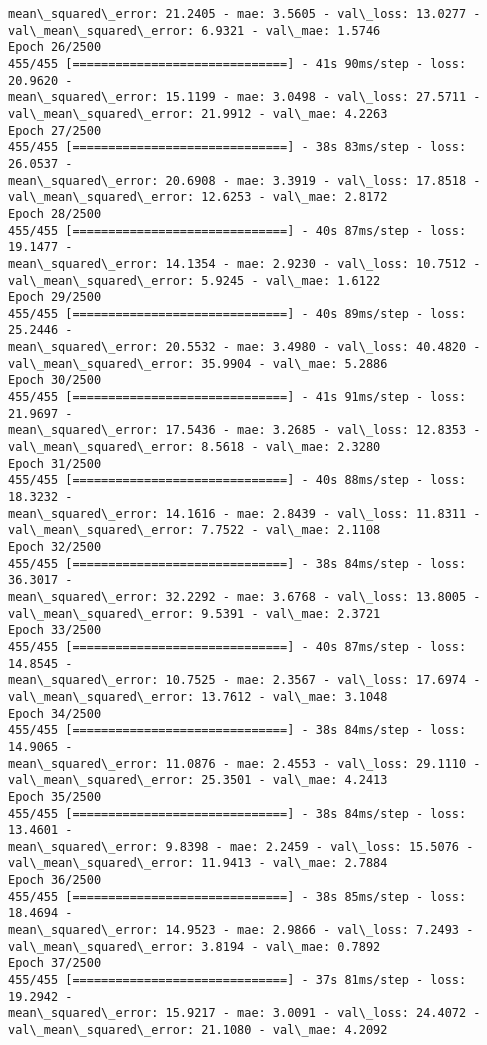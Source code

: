 \documentclass[11pt]{article}
\begin{document}
\begin{Verbatim}[commandchars=\\\{\}]
mean\_squared\_error: 21.2405 - mae: 3.5605 - val\_loss: 13.0277 -
val\_mean\_squared\_error: 6.9321 - val\_mae: 1.5746
Epoch 26/2500
455/455 [==============================] - 41s 90ms/step - loss: 20.9620 -
mean\_squared\_error: 15.1199 - mae: 3.0498 - val\_loss: 27.5711 -
val\_mean\_squared\_error: 21.9912 - val\_mae: 4.2263
Epoch 27/2500
455/455 [==============================] - 38s 83ms/step - loss: 26.0537 -
mean\_squared\_error: 20.6908 - mae: 3.3919 - val\_loss: 17.8518 -
val\_mean\_squared\_error: 12.6253 - val\_mae: 2.8172
Epoch 28/2500
455/455 [==============================] - 40s 87ms/step - loss: 19.1477 -
mean\_squared\_error: 14.1354 - mae: 2.9230 - val\_loss: 10.7512 -
val\_mean\_squared\_error: 5.9245 - val\_mae: 1.6122
Epoch 29/2500
455/455 [==============================] - 40s 89ms/step - loss: 25.2446 -
mean\_squared\_error: 20.5532 - mae: 3.4980 - val\_loss: 40.4820 -
val\_mean\_squared\_error: 35.9904 - val\_mae: 5.2886
Epoch 30/2500
455/455 [==============================] - 41s 91ms/step - loss: 21.9697 -
mean\_squared\_error: 17.5436 - mae: 3.2685 - val\_loss: 12.8353 -
val\_mean\_squared\_error: 8.5618 - val\_mae: 2.3280
Epoch 31/2500
455/455 [==============================] - 40s 88ms/step - loss: 18.3232 -
mean\_squared\_error: 14.1616 - mae: 2.8439 - val\_loss: 11.8311 -
val\_mean\_squared\_error: 7.7522 - val\_mae: 2.1108
Epoch 32/2500
455/455 [==============================] - 38s 84ms/step - loss: 36.3017 -
mean\_squared\_error: 32.2292 - mae: 3.6768 - val\_loss: 13.8005 -
val\_mean\_squared\_error: 9.5391 - val\_mae: 2.3721
Epoch 33/2500
455/455 [==============================] - 40s 87ms/step - loss: 14.8545 -
mean\_squared\_error: 10.7525 - mae: 2.3567 - val\_loss: 17.6974 -
val\_mean\_squared\_error: 13.7612 - val\_mae: 3.1048
Epoch 34/2500
455/455 [==============================] - 38s 84ms/step - loss: 14.9065 -
mean\_squared\_error: 11.0876 - mae: 2.4553 - val\_loss: 29.1110 -
val\_mean\_squared\_error: 25.3501 - val\_mae: 4.2413
Epoch 35/2500
455/455 [==============================] - 38s 84ms/step - loss: 13.4601 -
mean\_squared\_error: 9.8398 - mae: 2.2459 - val\_loss: 15.5076 -
val\_mean\_squared\_error: 11.9413 - val\_mae: 2.7884
Epoch 36/2500
455/455 [==============================] - 38s 85ms/step - loss: 18.4694 -
mean\_squared\_error: 14.9523 - mae: 2.9866 - val\_loss: 7.2493 -
val\_mean\_squared\_error: 3.8194 - val\_mae: 0.7892
Epoch 37/2500
455/455 [==============================] - 37s 81ms/step - loss: 19.2942 -
mean\_squared\_error: 15.9217 - mae: 3.0091 - val\_loss: 24.4072 -
val\_mean\_squared\_error: 21.1080 - val\_mae: 4.2092

\end{Verbatim}
\end{document}
